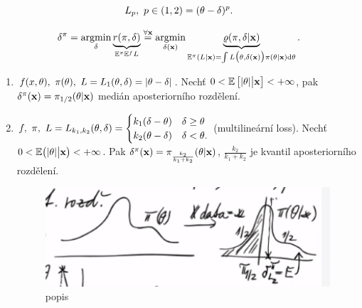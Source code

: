 $$ L_p,~p\in(1,2)=(\theta-\delta)^p.$$

$$\delta^\pi=\mathop{\mathrm{argmin}}_\delta \underbrace{r(\pi,\delta)}_{\mathbb{E}^\pi\mathbb{E}^f L}\stackrel{\forall\textbf{x}}{=}\mathop{\mathrm{argmin}}_{\delta(\textbf{x})}\underbrace{\varrho(\pi,\delta|\textbf{x})}_{\mathbb{E}^\pi(L|\textbf{x})=\int L\big(\theta,\delta(\textbf{x})\big)\pi(\theta|\textbf{x})\mathrm{d}\theta}.$$


\begin{theorem}\begin{enumerate}[a:]
		\item $f(x,\theta),~\pi(\theta),~L=L_1(\theta,\delta)=|\theta-\delta|$. Nechť $0<\mathbb{E}\left[ |\theta|\big|\textbf{x} \right]<+\infty$, pak $\delta^\pi(\textbf{x})=\pi_{1/2}(\theta|\textbf{x})$ medián aposteriorního rozdělení.
		\item $f,~\pi,~L=L_{k_1,k_2}(\theta,\delta)=\begin{cases}
		k_1(\delta-\theta)&\delta\geq \theta \\ k_2(\theta-\delta)& \delta<\theta.
		\end{cases}$ (multilineární loss). Nechť $0<\mathbb{E}\big(|\theta|\big|\textbf{x}\big)<+\infty$. Pak $\delta^\pi(\textbf{x})=\pi_{\frac{k_2}{k_1+k_2}}(\theta|\textbf{x})$, $\frac{k_2}{k_1+k_2}$ je kvantil aposteriorního rozdělení.
		\begin{figure}[h]
			\centering
			\includegraphics[width=0.7\linewidth]{pictures/10.12}
			\caption{popis}
			\label{fig:10}
		\end{figure}
		

\end{enumerate}
\end{theorem}
